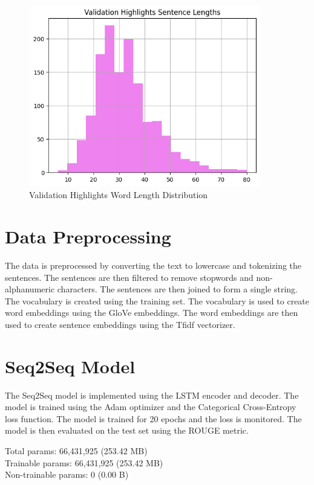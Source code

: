 \documentclass{article}
\begin{document}
\begin{figure}[h]
    \label{fig:word_freq_5}
    \centering
    \includegraphics[width=0.9\textwidth]{vall.png}
    \caption{Validation Highlights Word Length Distribution}
\end{figure}


\section{Data Preprocessing}
The data is preprocessed by converting the text to lowercase and tokenizing the sentences. The sentences are then filtered to remove stopwords and non-alphanumeric characters. The sentences are then joined to form a single string. The vocabulary is created using the training set. The vocabulary is used to create word embeddings using the GloVe embeddings. The word embeddings are then used to create sentence embeddings using the Tfidf vectorizer.

\section{Seq2Seq Model}
The Seq2Seq model is implemented using the LSTM encoder and decoder. The model is trained using the Adam optimizer and the Categorical Cross-Entropy loss function. The model is trained for 20 epochs and the loss is monitored. The model is then evaluated on the test set using the ROUGE metric.

Total params: 66,431,925 (253.42 MB)\\
Trainable params: 66,431,925 (253.42 MB)\\
Non-trainable params: 0 (0.00 B)
\end{document}

